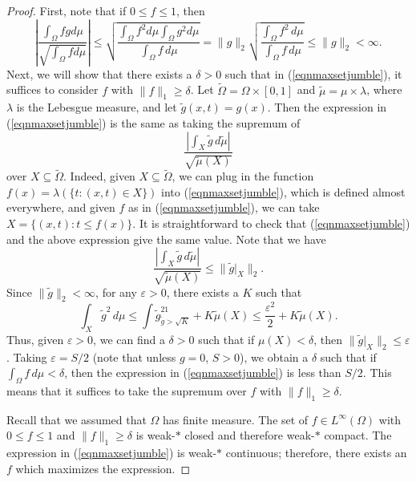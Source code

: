 \documentclass{amsart}
\numberwithin{equation}{section}
\numberwithin{figure}{section}
\theoremstyle{definition}
\theoremstyle{remark}
\newcommand{\eps}{\varepsilon}
\newcommand{\wOmega}{{\widetilde{\Omega}}}
\newcommand{\wg}{\widetilde{g}}
\begin{document}
\begin{proof}
First, note that if $0 \le f \le 1$, then
\[
 \left|\frac{\int_\Omega fgd \mu}{\sqrt{\int_\Omega f d \mu}} \right|
 \le \sqrt{\frac{\int_\Omega f^2 d \mu\int_\Omega g^2 d \mu}{\int_\Omega f \,d\mu}}
 = \|g\|_2 \sqrt{\frac{\int_\Omega f^2 \,d\mu}{\int_\Omega f \,d\mu}} \le \|g\|_2<\infty
.\] Next, we will show that there exists a $\delta>0$ such that in
(\ref{eqnmaxsetjumble}), it suffices to consider $f$ with $\|f\|_1 \ge
\delta$. Let $\wOmega=\Omega \times [0,1]$ and
$\widetilde\mu=\mu\times\lambda$, where $\lambda$ is the Lebesgue measure,
and let $\wg(x,t)=g(x)$. Then the expression in (\ref{eqnmaxsetjumble}) is
the same as taking the supremum of
\[\frac{\left|\int_X \wg \,d\widetilde\mu\right|}{\sqrt{\widetilde\mu(X)}}
\]
over $X \subseteq \wOmega$. Indeed, given $X \subseteq \wOmega$, we can plug
in the function $f(x)=\lambda(\{t:(x,t) \in X\})$ into
(\ref{eqnmaxsetjumble}), which is defined almost everywhere, and given $f$ as
in (\ref{eqnmaxsetjumble}), we can take $X=\{(x,t):t \le f(x)\}$. It is
straightforward to check that (\ref{eqnmaxsetjumble}) and the above
expression give the same value. Note that we have
\[
\frac{\left|\int_X \wg \,d\widetilde\mu\right|}{\sqrt{\widetilde\mu(X)}} \le \|\wg|_{X}\|_2
.\] Since $\|\wg\|_2<\infty$, for any $\eps>0$, there exists a $K$ such that
\[
\int_X \wg^2 \,d\mu
\leq \int \wg^21_{\wg>\sqrt K}+ K\widetilde\mu(X) \leq \frac{\eps^2}2 + K\widetilde\mu(X).
\]
Thus, given $\eps>0$, we can find a $\delta>0$ such that if $\mu(X)<\delta$,
then $\|\wg|_{X}\|_2\leq\eps$. Taking $\eps = S/2$ (note that unless $g=0$,
$S>0$), we obtain a $\delta$ such that if $\int_\Omega f \,d\mu<\delta$, then
the expression in (\ref{eqnmaxsetjumble}) is less than $S/2$. This means that
it suffices to take the supremum over $f$ with $\|f\|_1 \ge \delta$.

Recall that we assumed that $\Omega$ has finite measure. The set of $f \in
L^\infty(\Omega)$ with $0 \le f \le 1$ and $\|f\|_1 \ge \delta$ is weak-$*$
closed and therefore weak-$*$ compact. The expression in
(\ref{eqnmaxsetjumble}) is weak-$*$ continuous; therefore, there exists an
$f$ which maximizes the expression.


\end{proof}
\end{document}
